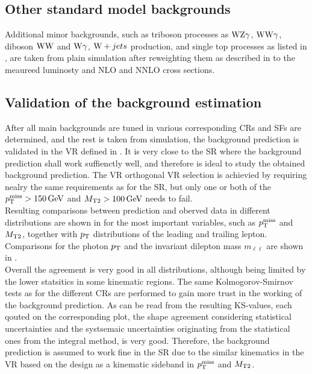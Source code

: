 \subsection{Other standard model backgrounds}
Additional minor backgrounds, such as triboson processes as $\mathrm{W}\mathrm{Z}\gamma$, $\mathrm{W}\mathrm{W}\gamma$, diboson $\mathrm{W}\mathrm{W}$ and $\mathrm{W}\gamma$, $\mathrm{W}+jets$ production, and single top processes as listed in , are taken from plain simulation after reweighting them as described in  to the meaureed luminosty and NLO and NNLO cross sections.

\FloatBarrier
\subsection{Validation of the background estimation}\label{sec:Validation}
After all main backgrounds are tuned in various corresponding CRs and SFs are determined, and the rest is taken from simulation, the background prediction is validated in the VR defined in . It is very close to the SR where the background prediction shall work suffienctly well, and therefore is ideal to study the obtained background prediction. The VR orthogonal VR selection is achievied by requiring nealry the same requirements as for the SR, but only one or both of the $p_{\mathrm{T}}^\text{miss}>150\,\text{Ge\hspace{-.08em}V}$ and $M_{\mathrm{T2}}>100\,\text{Ge\hspace{-.08em}V}$ needs to fail.\\
Resulting comparisons between prediction and oberved data in different distributions are shown in  for the most important variables, such as $p_{\mathrm{T}}^\text{miss}$ and $M_{\mathrm{T2}}$, together with $p_{\mathrm{T}}$ distributions of the leading and trailing lepton. Comparisons for the photon $p_{\mathrm{T}}$ and the invariant dilepton mass $m_{\ell\ell}$ are shown in .\\
Overall the agreement is very good in all distributions, although being limited by the lower statsitics in some kinematic regions. The same Kolmogorov-Smirnov tests as for the different CRs are performed to gain more trust in the working of the background prediction. As can be read from the resulting KS-values, each qouted on the corresponding plot, the shape agreement considering statistical uncertainties and the systsemaic uncertainties originating from the statistical ones from the integral method, is very good. Therefore, the background prediction is assumed to work fine in the SR due to the similar kinematics in the VR based on the design as a kinematic sideband in $p_{\mathrm{T}}^\text{miss}$ and $M_{\mathrm{T2}}$.

